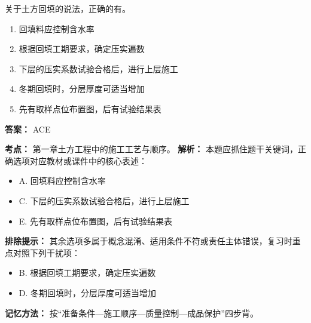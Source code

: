 \documentclass[UTF8,fontset=fandol,11pt]{ctexart}
\begin{document}
\begin{quizbox}[title={第 20 题}]
关于土方回填的说法，正确的有。\\
\begin{enumerate}[label=\Alph*.]
\item 回填料应控制含水率
\item 根据回填工期要求，确定压实遍数
\item 下层的压实系数试验合格后，进行上层施工
\item 冬期回填时，分层厚度可适当增加
\item 先有取样点位布置图，后有试验结果表
\end{enumerate}
\textbf{答案：} ACE
\vspace{0.25em}
\begin{answerbox}[title={考点解析}]
\textbf{考点：} 第一章土方工程中的施工工艺与顺序。
\textbf{解析：} 本题应抓住题干关键词，正确选项对应教材或课件中的核心表述：
\begin{itemize}
\item A. 回填料应控制含水率
\item C. 下层的压实系数试验合格后，进行上层施工
\item E. 先有取样点位布置图，后有试验结果表
\end{itemize}
\textbf{排除提示：} 其余选项多属于概念混淆、适用条件不符或责任主体错误，复习时重点对照下列干扰项：
\begin{itemize}
\item B. 根据回填工期要求，确定压实遍数
\item D. 冬期回填时，分层厚度可适当增加
\end{itemize}
\textbf{记忆方法：} 按“准备条件—施工顺序—质量控制—成品保护”四步背。
\end{answerbox}
\end{quizbox}
\end{document}
